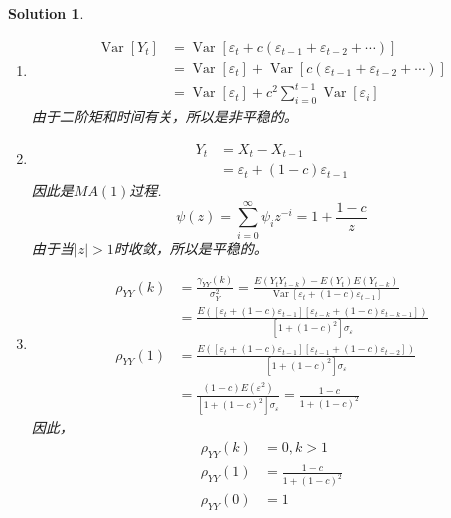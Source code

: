 \documentclass[a4paper,UTF8]{article}
\numberwithin{equation}{section}
\newtheorem*{mySol}{Solution}
\begin{document}
\begin{enumerate}
 \begin{mySol}
 ~\\
 	\begin{enumerate}[1)]
         \item
             \begin{align*}
                  \operatorname{Var}\left[Y_t\right] &=\operatorname{Var}\left[\varepsilon_t+c\left(\varepsilon_{t-1}+\varepsilon_{t-2}+\cdots\right)\right] \\
                  &=\operatorname{Var}\left[\varepsilon_t\right]+\operatorname{Var}\left[c\left(\varepsilon_{t-1}+\varepsilon_{t-2}+\cdots\right)\right] \\
                  &=\operatorname{Var}\left[\varepsilon_t\right] + c^2\sum_{i=0}^{t-1} \operatorname{Var}\left[\varepsilon_i\right]
             \end{align*}
         由于二阶矩和时间有关，所以是非平稳的。
         \item \begin{align*}
             Y_t&=X_t-X_{t-1} \\
             &= \varepsilon_{t} + (1-c)\varepsilon_{t-1}
         \end{align*}
         因此是$MA(1)$过程.
         $$
             \psi(z)=\sum_{i=0}^{\infty}\psi_iz^{-i}
             = 1+\frac{1-c}{z}
         $$
         由于当$|z|>1$时收敛，所以是平稳的。
         \item \begin{align*}
             \rho_{YY}(k)&=\frac{\gamma_{YY}(k)}{\sigma_Y^2}=\frac{E(Y_tY_{t-k})-E(Y_t)E(Y_{t-k})}{\operatorname{Var}[\varepsilon_t+(1-c)\varepsilon_{t-1}]} \\
             &= \frac{E([\varepsilon_t+(1-c)\varepsilon_{t-1}][\varepsilon_{t-k}+(1-c)\varepsilon_{t-k-1}])}{[1+(1-c)^2]\sigma_{\varepsilon}} \\
             \rho_{YY}(1) &= \frac{E([\varepsilon_t+(1-c)\varepsilon_{t-1}][\varepsilon_{t-1}+(1-c)\varepsilon_{t-2}])}{[1+(1-c)^2]\sigma_{\varepsilon}} \\
             &= \frac{(1-c)E(\varepsilon^2)}{[1+(1-c)^2]\sigma_{\varepsilon}} = \frac{1-c}{1+(1-c)^2}
         \end{align*}
         因此，
         \begin{align*}
             \rho_{YY}(k) &= 0, k>1 \\
             \rho_{YY}(1) &= \frac{1-c}{1+(1-c)^2} \\
             \rho_{YY}(0) &= 1
         \end{align*}
     \end{enumerate}


\end{mySol}
\end{enumerate}
\end{document}
